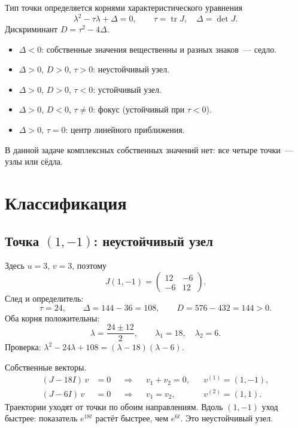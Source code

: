 \documentclass[12pt,a4paper]{article}
\begin{document}
Тип точки определяется корнями характеристического уравнения
\begin{equation}
\label{eq:char}
\lambda^2 - \tau\lambda + \Delta = 0,
\qquad
\tau = \operatorname{tr} J,\quad
\Delta = \det J.
\end{equation}
Дискриминант \(D = \tau^2 - 4\Delta\).
\begin{itemize}
  \item \(\Delta < 0\): собственные значения вещественны и разных знаков~--- седло.
  \item \(\Delta > 0\), \(D > 0\), \(\tau > 0\): неустойчивый узел.
  \item \(\Delta > 0\), \(D > 0\), \(\tau < 0\): устойчивый узел.
  \item \(\Delta > 0\), \(D < 0\), \(\tau \neq 0\): фокус (устойчивый при \(\tau < 0\)).
  \item \(\Delta > 0\), \(\tau = 0\): центр линейного приближения.
\end{itemize}
В данной задаче комплексных собственных значений нет: все четыре точки~--- узлы или сёдла.

\section{Классификация}

\subsection{Точка \((1,-1)\): неустойчивый узел}

Здесь \(u = 3\), \(v = 3\), поэтому
\[
J(1,-1) =
\begin{pmatrix} 12 & -6 \\ -6 & 12 \end{pmatrix}.
\]
След и определитель:
\[
\tau = 24, \qquad \Delta = 144 - 36 = 108, \qquad D = 576 - 432 = 144 > 0.
\]
Оба корня положительны:
\[
\lambda = \frac{24 \pm 12}{2},
\qquad
\lambda_1 = 18, \quad \lambda_2 = 6.
\]
Проверка: \(\lambda^2 - 24\lambda + 108 = (\lambda-18)(\lambda-6)\).

Собственные векторы.
\begin{align*}
(J - 18I)\,v &= 0
&&\Longrightarrow&&
v_1 + v_2 = 0,
&& v^{(1)} = (1,-1),\\
(J - 6I)\,v &= 0
&&\Longrightarrow&&
v_1 = v_2,
&& v^{(2)} = (1,1).
\end{align*}
Траектории уходят от точки по обоим направлениям. Вдоль \((1,-1)\) уход быстрее: показатель \(e^{18t}\) растёт быстрее, чем \(e^{6t}\). Это неустойчивый узел.
\end{document}
